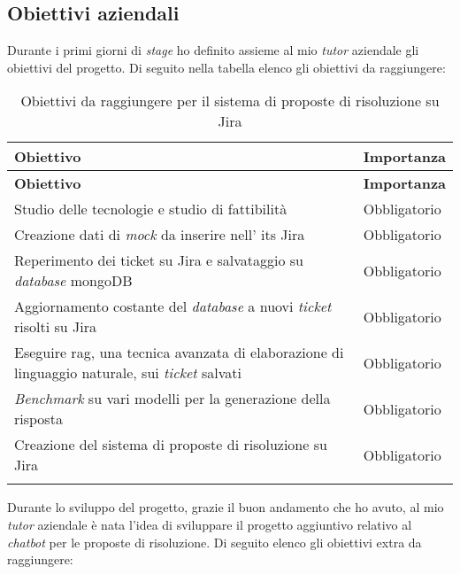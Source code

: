 \subsection{Obiettivi aziendali}
Durante i primi giorni di \textit{stage} ho definito assieme al mio \textit{tutor} aziendale gli obiettivi del progetto.
Di seguito nella tabella elenco gli obiettivi da raggiungere:
\renewcommand{\arraystretch}{2}
\begin{longtable}{|p{10cm}|p{2cm}|}
    \hline
    \rowcolor{tableheader}\textbf{Obiettivo} & \textbf{Importanza} \\
    \hline
    \endfirsthead

    \rowcolor{tableheader}\textbf{Obiettivo} & \textbf{Importanza} \\
    \hline
    \endhead

    \hline
    \endfoot

    \hline
    \endlastfoot
    \rowcolor{tableoddrow} Studio delle tecnologie e studio di fattibilità & Obbligatorio \\
    \hline
    \rowcolor{tableevenrow} Creazione dati di \textit{mock} da inserire nell' \gls{its} Jira & Obbligatorio \\
    \hline
    \rowcolor{tableoddrow} Reperimento dei ticket su Jira e salvataggio su \textit{database} mongoDB & Obbligatorio \\
    \hline
    \rowcolor{tableevenrow} Aggiornamento costante del \textit{database} a nuovi \textit{ticket} risolti su Jira & Obbligatorio \\
    \hline
    \rowcolor{tableoddrow} Eseguire \gls{rag}, una tecnica avanzata di elaborazione di linguaggio naturale, sui \textit{ticket} salvati & Obbligatorio \\
    \hline
    \rowcolor{tableevenrow} \textit{Benchmark} su vari modelli per la generazione della risposta & Obbligatorio \\
    \hline
    \rowcolor{tableoddrow} Creazione del sistema di proposte di risoluzione su Jira & Obbligatorio \\
    \hline
    \caption{Obiettivi da raggiungere per il sistema di proposte di risoluzione su Jira}
    \label{tab:obiettiviJira}
\end{longtable}
\noindent
Durante lo sviluppo del progetto, grazie il buon andamento che ho avuto, al mio \textit{tutor} aziendale è nata l'idea di sviluppare il progetto aggiuntivo relativo al \textit{chatbot} per le proposte di risoluzione.
Di seguito elenco gli obiettivi extra da raggiungere:
